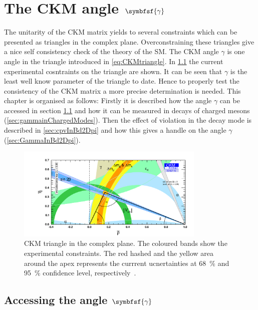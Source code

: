 \chapter[head={The CKM angle $\gamma$},tocentry={The CKM angle $\symbfsf{\gamma}$}]{The CKM angle $\symbfsf{\gamma}$}
\label{ch:CKMAngleGamma}

The unitarity of the CKM matrix yields to several constraints which can be presented as triangles in the complex plane.
Overconstraining these triangles give a nice self consistency check of the theory of the \ac{SM}.
The CKM angle $\gamma$ is one angle in the triangle introduced in \cref{eq:CKMtriangle}.
In \cref{fig:ckmtriangle} the current experimental cosntraints on the triangle are shown.
It can be seen that $\gamma$ is the least well know parameter of the triangle to date.
Hence to properly test the consistency of the CKM matrix a more precise determination is needed.
This chapter is organised as follows: Firstly it is described how the angle $\gamma$ can be accessed in section \cref{sec:accessGamma} and how it can be measured in decays of charged \B mesons (\cref{sec:gammainChargedModes}).
Then the effect of \CP violation in the decay mode \BdToDpi is described in \cref{sec:cpvInBd2Dpi} and how this gives a handle on the angle $\gamma$ (\cref{sec:GammaInBd2Dpi}).

\begin{figure}[tbp]
	\centering
	\includegraphics[width=0.8\textwidth]{04gamma/figs/CKMTriangle.pdf}
	\caption{CKM triangle in the complex plane.
	The coloured bands show the experimental constraints.
	The red hashed and the yellow area around the apex represents the currrent ucnertainties at \SI{68}{\percent} and \SI{95}{\percent} confidence level, respectively~\cite{CKMfitter2015}.}
	\label{fig:ckmtriangle}
\end{figure}

\section[head={Accessing the angle $\gamma$},tocentry={Accessing the angle $\gamma$}]{Accessing the angle $\symbfsf{\gamma}$}
\label{sec:accessGamma}

